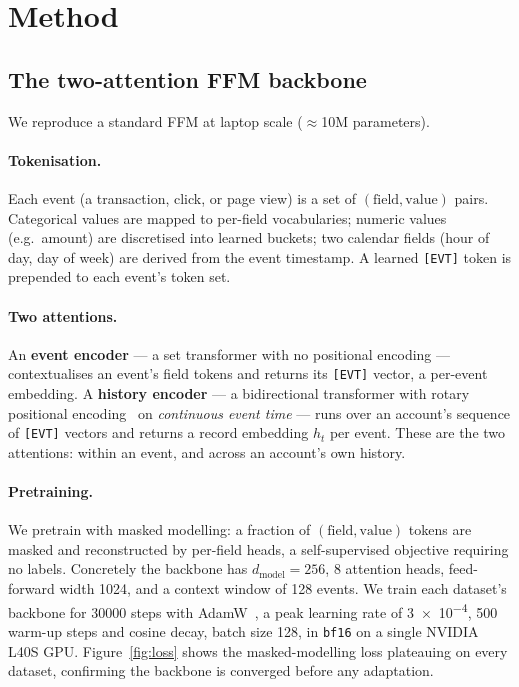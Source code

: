 \section{Method}
\label{sec:method}



\subsection{The two-attention FFM backbone}
\label{sec:method:backbone}
We reproduce a standard FFM at laptop scale ($\approx$\num{10}M parameters).

\paragraph{Tokenisation.} Each event (a transaction, click, or page view) is a set of
$(\textrm{field},\textrm{value})$ pairs. Categorical values are mapped to per-field vocabularies;
numeric values (e.g.\ amount) are discretised into learned buckets; two calendar fields (hour of
day, day of week) are derived from the event timestamp. A learned \texttt{[EVT]} token is prepended
to each event's token set.

\paragraph{Two attentions.} An \textbf{event encoder} --- a set transformer with no positional
encoding --- contextualises an event's field tokens and returns its \texttt{[EVT]} vector, a
per-event embedding. A \textbf{history encoder} --- a bidirectional transformer with rotary
positional encoding~\cite{su2021roformer} on \emph{continuous event time} --- runs over an account's
sequence of \texttt{[EVT]} vectors and returns a record embedding $h_t$ per event. These are the two
attentions: within an event, and across an account's own history.

\paragraph{Pretraining.} We pretrain with masked modelling: a fraction of $(\textrm{field},
\textrm{value})$ tokens are masked and reconstructed by per-field heads, a self-supervised objective
requiring no labels. Concretely the backbone has $d_{\text{model}}{=}\num{256}$, \num{8} attention
heads, feed-forward width \num{1024}, and a context window of \num{128} events. We train each
dataset's backbone for \num{30000} steps with AdamW~\cite{loshchilov2019adamw}, a peak learning rate
of \num{3e-4}, \num{500} warm-up steps and cosine decay, batch size \num{128}, in \texttt{bf16} on a
single NVIDIA L40S GPU. Figure~\ref{fig:loss} shows the masked-modelling loss plateauing on every
dataset, confirming the backbone is converged before any adaptation.

